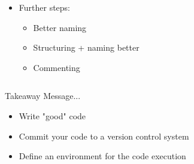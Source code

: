 \documentclass[aspectratio=169,10pt]{beamer}
\begin{document}
\begin{frame}[t,fragile]
\begin{columns}
\begin{column}{0.55\paperwidth}
\begin{itemize}
                \item<2-> Further steps:
                \begin{itemize}
                    \item Better naming
                    \item Structuring + naming better
                    \item Commenting
                \end{itemize}
            \end{itemize}
        \end{column}
        \begin{column}{0.5\paperwidth}
            \begin{center}
            \end{center}
        \end{column}
    \end{columns}
\end{frame}

\begin{frame}[t,fragile]{Takeaway Message...}
    \vspace{2cm}
    \begin{center}
    \colorbox{green!15}{
    \parbox[c]{8cm}{
    \begin{itemize}
        \item Write "good" code
        \item Commit your code to a version control system
        \item Define an environment for the code execution
    \end{itemize}
    }
    }
    \end{center}
\end{frame}
\end{document}

